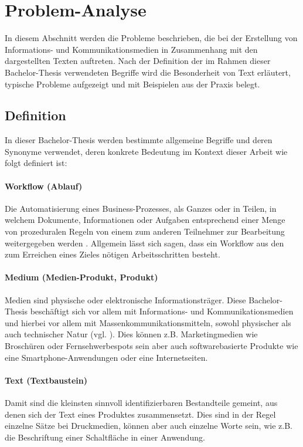 \section{Problem-Analyse}

In diesem Abschnitt werden die Probleme beschrieben, die bei der Erstellung von Informations- und Kommunikationsmedien in Zusammenhang mit den dargestellten Texten auftreten. Nach der Definition der im Rahmen dieser Bachelor-Thesis verwendeten Begriffe wird die Besonderheit von Text erläutert,  typische Probleme aufgezeigt und mit Beispielen aus der Praxis belegt.

\subsection{Definition}
\label{l:def}

In dieser Bachelor-Thesis werden bestimmte allgemeine Begriffe und deren Synonyme verwendet, deren konkrete Bedeutung im Kontext dieser Arbeit wie folgt definiert ist:

\paragraph{Workflow (Ablauf)} Die Automatisierung eines Business-Prozesses, als Ganzes oder in Teilen, in welchem Dokumente, Informationen oder Aufgaben entsprechend einer Menge von prozeduralen Regeln von einem zum anderen Teilnehmer zur Bearbeitung weitergegeben werden \cite[S.8]{wmc}. Allgemein lässt sich sagen, dass ein Workflow aus den zum Erreichen eines Zieles nötigen Arbeitsschritten besteht.

\paragraph{Medium (Medien-Produkt, Produkt)} Medien sind physische oder elektronische Informationsträger. Diese Bachelor-Thesis beschäftigt sich vor allem mit Informations- und Kommunikationsmedien und hierbei vor allem mit Massenkommunikationsmitteln, sowohl physischer als auch technischer Natur (vgl. \cite[S.199--201]{schanze2002metzler}). Dies können z.B. Marketingmedien wie Broschüren oder Fernsehwerbespots sein aber auch softwarebasierte Produkte wie eine Smartphone-Anwendungen oder eine Internetseiten. 

\paragraph{Text (Textbaustein)} Damit sind die kleinsten sinnvoll identifizierbaren Bestandteile gemeint, aus denen sich der Text eines Produktes zusammensetzt. Dies sind in der Regel einzelne Sätze bei Druckmedien, können aber auch einzelne Worte sein, wie z.B. die Beschriftung einer Schaltfläche in einer Anwendung.

